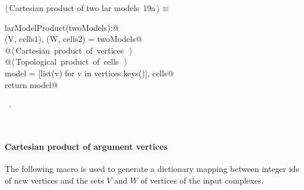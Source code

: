 \documentclass[11pt,oneside]{article}	%
\begin{document}
\begin{flushleft} \small
\begin{minipage}{\linewidth} \label{scrap26}
\protect{}$\langle\,$Cartesian product of two lar models\nobreak\ {\footnotesize 19a}$\,\rangle\equiv$
\vspace{-1ex}
\begin{list}{}{} \item
\mbox{}\verb@def larModelProduct(twoModels):@\\
\mbox{}\verb@    (V, cells1), (W, cells2) = twoModels@\\
\mbox{}\verb@    @\hbox{$\langle\,$Cartesian product of vertices\nobreak\ {\footnotesize {}}$\,\rangle$}\verb@@\\
\mbox{}\verb@    @\hbox{$\langle\,$Topological product of cells\nobreak\ {\footnotesize {}}$\,\rangle$}\verb@@\\
\mbox{}\verb@    model = [list(v) for v in vertices.keys()], cells@\\
\mbox{}\verb@    return model@\\
\mbox{}\verb@@{\NWsep}
\end{list}
\vspace{-1ex}
\footnotesize\addtolength{\baselineskip}{-1ex}
\begin{list}{}{\setlength{\itemsep}{-\parsep}\setlength{\itemindent}{-\leftmargin}}
\item \NWtxtMacroRefIn\ .
\end{list}
\end{minipage}\\[4ex]
\end{flushleft}

\paragraph{Cartesian product of argument vertices}
The following macro is used to generate a dictionary mapping between integer ids of new vertices and the sets $V$ and $W$ of vertices of the input complexes.
\end{document}
